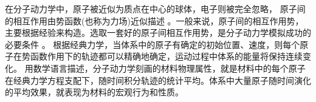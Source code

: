 在分子动力学中，原子被近似为质点在中心的球体，电子则被完全忽略，%
原子间的相互作用由势函数(也称为力场)近似描述%
。一般来说，原子间的相互作用势，主要根据经验来构造。选取一套好的原子间相互作用势，是分子动力学模拟成功的必要条件%
。
%
根据经典力学，当体系中的原子有确定的初始位置、速度，则每个原子在势函数作用下的轨迹都可以精确地确定，运动过程中体系的能量将保持连续变化。%
%
用数学语言描述，分子动力学刻画的材料物理属性，就是材料中的每个原子在经典力学方程支配下，随时间积分轨迹的统计平均。体系中大量原子随时间演化的平均效果，就表现为材料的宏观行为和性质。%
